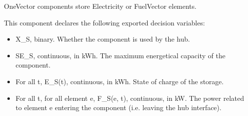 \documentclass[letterpaper,10pt,english]{sphinxmanual}
\begin{document}
\begin{fulllineitems}
\label{\detokenize{generated/tamos.storage.OneVector:tamos.storage.OneVector}}
\pysigstartsignatures
{}
\pysigstopsignatures{}

\begin{fulllineitems}
\label{\detokenize{generated/tamos.storage.OneVector:tamos.storage.OneVector.__init__}}
\pysigstartsignatures
{}
\pysigstopsignatures
\sphinxAtStartPar
OneVector components store Electricity or FuelVector elements.

\sphinxAtStartPar
This component declares the following exported decision variables:
\begin{itemize}
\item {} 
\sphinxAtStartPar
X\_S, binary.
Whether the component is used by the hub.

\item {} 
\sphinxAtStartPar
SE\_S, continuous, in kWh.
The maximum energetical capacity of the component.

\item {} 
\sphinxAtStartPar
For all t, E\_S(t), continuous, in kWh.
State of charge of the storage.

\item {} 
\sphinxAtStartPar
For all t, for all element e, F\_S(e, t), continuous, in kW.
The power related to element e entering the component (i.e. leaving the hub interface).


\end{itemize}
\end{fulllineitems}
\end{fulllineitems}
\end{document}
